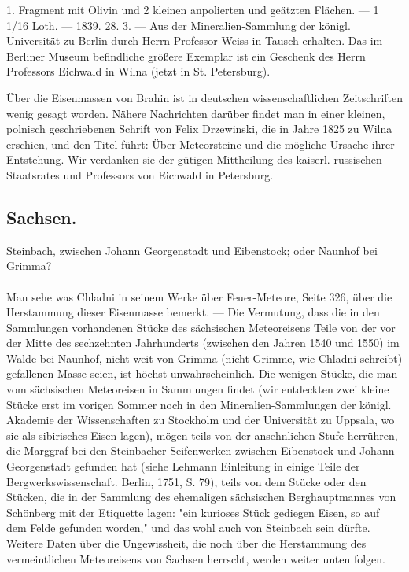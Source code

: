 \documentclass[a4paper, 11pt, oneside, polutonikogreek, german]{article}
\begin{document}
1. Fragment mit Olivin und 2 kleinen anpolierten und geätzten Flächen. — 1 1/16 Loth. — 1839. 28. 3. — Aus der Mineralien-Sammlung der königl. Universität zu Berlin durch Herrn Professor Weiss in Tausch erhalten. Das im Berliner Museum befindliche größere Exemplar ist ein Geschenk des Herrn Professors Eichwald in Wilna (jetzt in St. Petersburg).

Über die Eisenmassen von Brahin ist in deutschen wissenschaftlichen Zeitschriften wenig gesagt worden. Nähere Nachrichten darüber findet man in einer kleinen, polnisch geschriebenen Schrift von Felix Drzewinski, die in Jahre 1825 zu Wilna erschien, und den Titel führt: Über Meteorsteine und die mögliche Ursache ihrer Entstehung. Wir verdanken sie der gütigen Mittheilung des kaiserl. russischen Staatsrates und Professors von Eichwald in Petersburg.
\subsection{Sachsen.}
\begin{center}
\small
Steinbach, zwischen Johann Georgenstadt und Eibenstock; oder Naunhof bei Grimma?
\end{center}
\paragraph{}
Man sehe was Chladni in seinem Werke über Feuer-Meteore, Seite 326, über die Herstammung dieser Eisenmasse bemerkt. — Die Vermutung, dass die in den Sammlungen vorhandenen Stücke des sächsischen Meteoreisens Teile von der vor der Mitte des sechzehnten Jahrhunderts (zwischen den Jahren 1540 und 1550) im Walde bei Naunhof, nicht weit von Grimma (nicht Grimme, wie Chladni schreibt) gefallenen Masse seien, ist höchst unwahrscheinlich. Die wenigen Stücke, die man vom sächsischen Meteoreisen in Sammlungen findet (wir entdeckten zwei kleine Stücke erst im vorigen Sommer noch in den Mineralien-Sammlungen der königl. Akademie der Wissenschaften zu Stockholm und der Universität zu Uppsala, wo sie als sibirisches Eisen lagen), mögen teils von der ansehnlichen Stufe herrühren, die Marggraf bei den Steinbacher Seifenwerken zwischen Eibenstock und Johann Georgenstadt gefunden hat (siehe Lehmann Einleitung in einige Teile der Bergwerkswissenschaft. Berlin, 1751, S. 79), teils von dem Stücke oder den Stücken, die in der Sammlung des ehemaligen sächsischen Berghauptmannes von Schönberg mit der Etiquette lagen: "ein kurioses Stück gediegen Eisen, so auf dem Felde gefunden worden," und das wohl auch von Steinbach sein dürfte. Weitere Daten über die Ungewissheit, die noch über die Herstammung des vermeintlichen Meteoreisens von Sachsen herrscht, werden weiter unten folgen.
\end{document}
